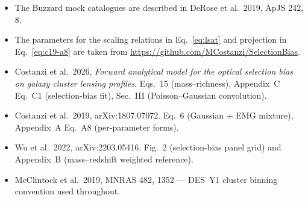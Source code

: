 \documentclass[a4paper, 11pt]{article}
\begin{document}
\begin{itemize}
  \setlength\itemsep{1pt}
  \item The Buzzard mock catalogues are described in DeRose et al.\ 2019, ApJS 242, 8.
  \item The parameters for the scaling relations in Eq.~\ref{eq:lsat} and projection in Eq.~\ref{eq:c19-a8} are taken from \href{https://github.com/MCostanzi/SelectionBias}{https://github.com/MCostanzi/SelectionBias}.
  \item Costanzi et al.\ 2026, \emph{Forward analytical model for the
    optical selection bias on galaxy cluster lensing profiles}.
    Eqs.~15 (mass--richness), Appendix~C Eq.~C1 (selection-bias fit),
    Sec.~III (Poisson--Gaussian convolution).
  \item Costanzi et al.\ 2019, arXiv:1807.07072. Eq.~6 (Gaussian + EMG
    mixture), Appendix~A Eq.~A8 (per-parameter forms).
  \item Wu et al.\ 2022, arXiv:2203.05416. Fig.~2 (selection-bias panel
    grid) and Appendix~B (mass--redshift weighted reference).
  \item McClintock et al.\ 2019, MNRAS 482, 1352 --- DES~Y1 cluster
    binning convention used throughout.
\end{itemize}
\end{document}
